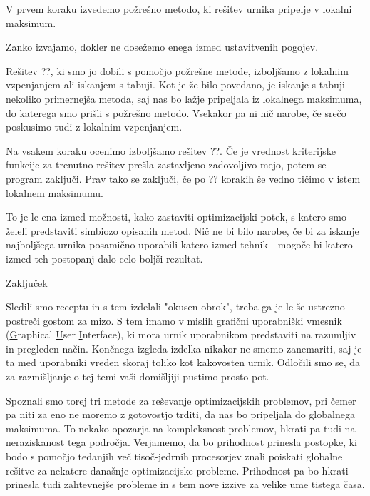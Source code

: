 \documentclass[a4paper,10pt]{article}
\begin{document}
   V prvem koraku izvedemo požrešno metodo, ki rešitev urnika pripelje v lokalni maksimum.

   Zanko izvajamo, dokler ne dosežemo enega izmed ustavitvenih pogojev.

   Rešitev ??, ki smo jo dobili s pomočjo požrešne metode, izboljšamo z lokalnim vzpenjanjem
   ali iskanjem s tabuji. Kot je že bilo povedano, je iskanje s tabuji nekoliko primernejša metoda,
   saj nas bo lažje pripeljala iz lokalnega maksimuma, do katerega smo prišli s požrešno metodo.
   Vsekakor pa ni nič narobe, če srečo poskusimo tudi z lokalnim vzpenjanjem.

   Na vsakem koraku ocenimo izboljšamo rešitev ??. Če je vrednost kriterijske funkcije
   za trenutno rešitev prešla zastavljeno zadovoljivo mejo, potem se program zaključi. Prav tako
   se zaključi, če po ?? korakih še vedno tičimo v istem lokalnem maksimumu.

To je le ena izmed možnosti, kako zastaviti optimizacijski potek, s katero smo želeli predstaviti
simbiozo opisanih metod. Nič ne bi bilo narobe, če bi za iskanje najboljšega urnika posamično
uporabili katero izmed tehnik - mogoče bi katero izmed teh postopanj dalo celo boljši rezultat.

Zaključek %

Sledili smo receptu in s tem izdelali "okusen obrok", treba ga je le še ustrezno postreči
gostom za mizo. S tem imamo v mislih grafični uporabniški vmesnik (\underline{G}raphical
\underline{U}ser \underline{I}nterface), ki mora urnik uporabnikom predstaviti na razumljiv in
pregleden način. Končnega izgleda izdelka nikakor ne smemo zanemariti, saj je ta med uporabniki
vreden skoraj toliko kot kakovosten urnik. Odločili smo se, da za razmišljanje o tej temi vaši
domišljiji pustimo prosto pot.

Spoznali smo torej tri metode za reševanje optimizacijskih problemov, pri čemer pa niti za eno
ne moremo z gotovostjo trditi, da nas bo pripeljala do globalnega maksimuma. To nekako opozarja
na kompleksnost problemov, hkrati pa tudi na neraziskanost tega področja. Verjamemo, da bo
prihodnost prinesla postopke, ki bodo s pomočjo tedanjih več tisoč-jedrnih procesorjev znali
poiskati globalne rešitve za nekatere današnje optimizacijske probleme. Prihodnost pa bo
hkrati prinesla tudi zahtevnejše probleme in s tem nove izzive za velike ume tistega časa.
\end{document}
